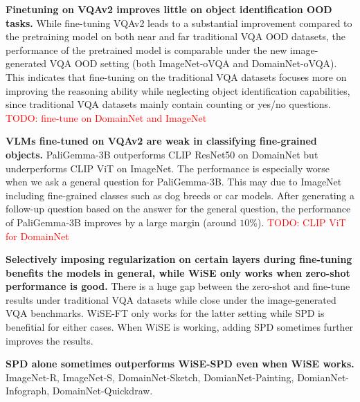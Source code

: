 


\textbf{Finetuning on VQAv2 improves little on object identification OOD tasks.} While fine-tuning VQAv2 leads to a substantial improvement compared to the pretraining model on both near and far traditional VQA OOD datasets, the performance of the pretrained model is comparable under the new image-generated VQA OOD setting (both ImageNet-oVQA and DomainNet-oVQA). This indicates that fine-tuning on the traditional VQA datasets focuses more on improving the reasoning ability while neglecting object identification capabilities, since traditional VQA datasets mainly contain counting or yes/no questions. \textcolor{red}{TODO: fine-tune on DomainNet and ImageNet}

\textbf{VLMs fine-tuned on VQAv2 are weak in classifying fine-grained objects.} PaliGemma-3B outperforms CLIP ResNet50 on DomainNet but underperforms CLIP ViT on ImageNet. The performance is especially worse when we ask a general question for PaliGemma-3B. This may due to ImageNet including fine-grained classes such as dog breeds or car models. After generating a follow-up question based on the answer for the general question, the performance of PaliGemma-3B improves by a large margin (around $10\%$). \textcolor{red}{TODO: CLIP ViT for DomainNet}

\textbf{Selectively imposing regularization on certain layers during fine-tuning benefits the models in general, while WiSE only works when zero-shot performance is good.} There is a huge gap between the zero-shot and fine-tune results under traditional VQA datasets while close under the image-generated VQA benchmarks. WiSE-FT only works for the latter setting while SPD is benefitial for either cases. When WiSE is working, adding SPD sometimes further improves the results. 

\textbf{SPD alone sometimes outperforms WiSE-SPD even when WiSE works.} ImageNet-R, ImageNet-S, DomainNet-Sketch, DomianNet-Painting, DomianNet-Infograph, DomainNet-Quickdraw.